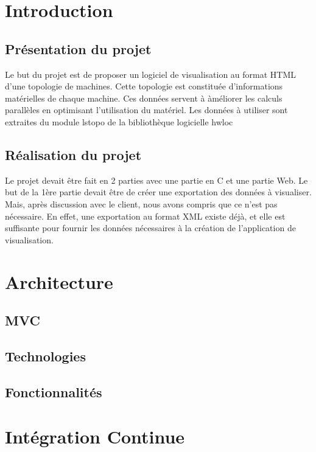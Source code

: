 \documentclass [a4paper,11pt]{article}
\begin{document}
\tableofcontents

\newpage

\section{Introduction}

\subsection{Présentation du projet}
Le but du projet est de proposer un logiciel de visualisation au format HTML d'une topologie de machines. Cette topologie est constituée d'informations matérielles de chaque machine. Ces données servent à àméliorer les calculs parallèles en optimisant l'utilisation du matériel. Les données à utiliser sont extraites du module lstopo de la bibliothèque logicielle hwloc

\subsection{Réalisation du projet}
Le projet devait être fait en 2 parties avec une partie en C et une partie Web. Le but de la 1ère partie devait être de créer une exportation des données à visualiser. Mais, après discussion avec le client, nous avons compris que ce n'est pas nécessaire. En effet, une exportation au format XML existe déjà, et elle est suffisante pour fournir les données nécessaires à la création de l'application de visualisation.

\newpage
\section{Architecture}

\subsection{MVC}

\subsection{Technologies}

\subsection{Fonctionnalités}
\newpage

\section{Intégration Continue}
\end{document}
